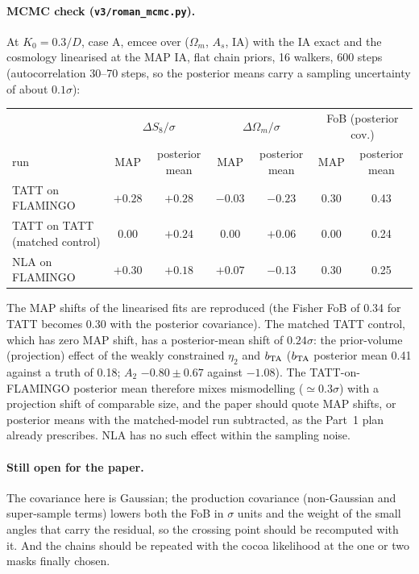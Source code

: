 \documentclass[11pt]{article}
\begin{document}
\paragraph{MCMC check (\texttt{v3/roman\_mcmc.py}).} At $K_0=0.3/D$, case A, emcee over ($\Omega_m$, $A_s$, IA) with the IA exact and the cosmology linearised at the MAP IA, flat chain priors, 16 walkers, 600 steps (autocorrelation 30--70 steps, so the posterior means carry a sampling uncertainty of about $0.1\sigma$):
\begin{center}\small
\begin{tabular}{l|cc|cc|cc}
\toprule
 & \multicolumn{2}{c|}{$\Delta S_8/\sigma$} & \multicolumn{2}{c|}{$\Delta\Omega_m/\sigma$} & \multicolumn{2}{c}{FoB (posterior cov.)}\\
run & MAP & posterior mean & MAP & posterior mean & MAP & posterior mean\\
\midrule
TATT on FLAMINGO & $+0.28$ & $+0.28$ & $-0.03$ & $-0.23$ & 0.30 & 0.43\\
TATT on TATT (matched control) & $0.00$ & $+0.24$ & $0.00$ & $+0.06$ & 0.00 & 0.24\\
NLA on FLAMINGO & $+0.30$ & $+0.18$ & $+0.07$ & $-0.13$ & 0.30 & 0.25\\
\bottomrule
\end{tabular}
\end{center}
The MAP shifts of the linearised fits are reproduced (the Fisher FoB of 0.34 for TATT becomes 0.30 with the posterior covariance). The matched TATT control, which has zero MAP shift, has a posterior-mean shift of $0.24\sigma$: the prior-volume (projection) effect of the weakly constrained $\eta_2$ and $b_{\rm TA}$ ($b_{\rm TA}$ posterior mean 0.41 against a truth of 0.18; $A_2$ $-0.80\pm0.67$ against $-1.08$). The TATT-on-FLAMINGO posterior mean therefore mixes mismodelling ($\simeq0.3\sigma$) with a projection shift of comparable size, and the paper should quote MAP shifts, or posterior means with the matched-model run subtracted, as the Part~1 plan already prescribes. NLA has no such effect within the sampling noise.

\paragraph{Still open for the paper.} The covariance here is Gaussian; the production covariance (non-Gaussian and super-sample terms) lowers both the FoB in $\sigma$ units and the weight of the small angles that carry the residual, so the crossing point should be recomputed with it. And the chains should be repeated with the cocoa likelihood at the one or two masks finally chosen.
\end{document}
